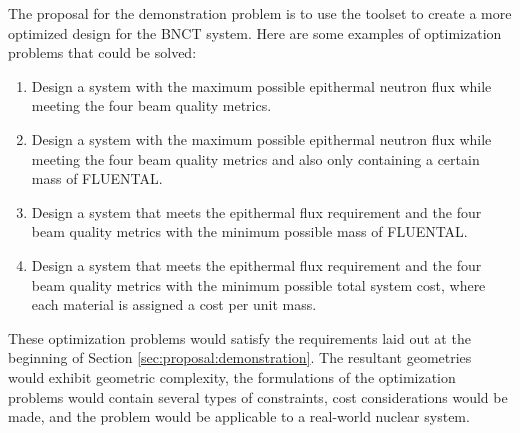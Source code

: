 The proposal for the demonstration problem is to use the toolset to create a more optimized design for the BNCT system.
Here are some examples of optimization problems that could be solved:
\begin{enumerate}
  \item Design a system with the maximum possible epithermal neutron flux while meeting the four beam quality metrics.
  \item Design a system with the maximum possible epithermal neutron flux while meeting the four beam quality metrics and also only containing a certain mass of FLUENTAL.
  \item Design a system that meets the epithermal flux requirement and the four beam quality metrics with the minimum possible mass of FLUENTAL.
  \item Design a system that meets the epithermal flux requirement and the four beam quality metrics with the minimum possible total system cost, where each material is assigned a cost per unit mass.
\end{enumerate}

These optimization problems would satisfy the requirements laid out at the beginning of Section \ref{sec:proposal:demonstration}.
The resultant geometries would exhibit geometric complexity, the formulations of the optimization problems would contain several types of constraints, cost considerations would be made, and the problem would be applicable to a real-world nuclear system.
